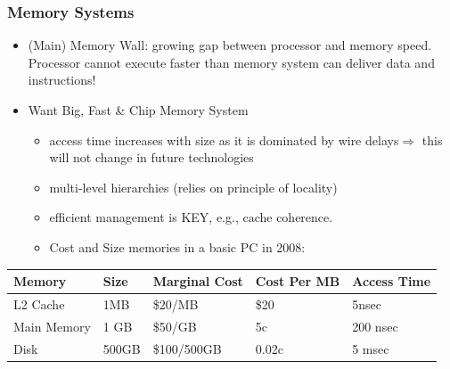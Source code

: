 \documentclass{beamer}
\newcommand{\emp}[1]{\textcolor{DikuRed}{ #1}}
\begin{document}
\begin{frame}[fragile,t]
\frametitle{Memory Systems}

\begin{itemize}
    \item \emp{(Main) Memory Wall:} growing gap between processor and memory speed.
            Processor cannot execute faster than memory system can deliver data 
            and instructions!\bigskip

    \item Want Big, Fast \& Chip Memory System\smallskip
    \begin{itemize}
        \item access time 
                increases with size as it is dominated by 
                wire delays$\Rightarrow$ this will not change in future technologies\smallskip
        \item multi-level hierarchies (relies on principle of locality)\smallskip
        \item efficient management is KEY, e.g., cache coherence.\smallskip
        \item Cost and Size memories in a basic PC in 2008:
    \end  {itemize} 
\end{itemize}
\bigskip

\begin{tabular}{|l|l|l|l|l|}\hline
Memory & Size  & Marginal Cost & Cost Per MB & Access Time \\\hline
L2 Cache & 1MB & \$20/MB & \$20 & 5nsec \\\hline
Main Memory & 1 GB & \$50/GB & 5c & 200 nsec \\\hline
Disk & 500GB & \$100/500GB & 0.02c & 5 msec \\\hline
\end{tabular}

\end{frame}
\end{document}
